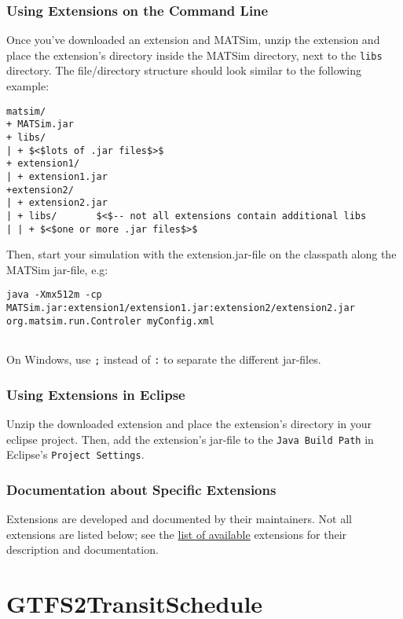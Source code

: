 \documentclass[a4paper,11pt]{report}
\begin{document}
\subsubsection{Using Extensions on the Command Line}

Once you've downloaded an extension and MATSim, unzip the extension  and place the extension's directory inside the MATSim directory, next to  the 
\texttt{libs} directory. The file/directory structure should look similar to the following example:
\begin{verbatim}
matsim/
+ MATSim.jar
+ libs/
| + $<$lots of .jar files$>$
+ extension1/
| + extension1.jar
+extension2/
| + extension2.jar
| + libs/       $<$-- not all extensions contain additional libs
| | + $<$one or more .jar files$>$
\end{verbatim}

Then, start your simulation with the extension.jar-file on the classpath along the MATSim jar-file, e.g:
\begin{verbatim}
java -Xmx512m -cp MATSim.jar:extension1/extension1.jar:extension2/extension2.jar org.matsim.run.Controler myConfig.xml


\end{verbatim}

On Windows, use 
\texttt{;} instead of 
\texttt{:} to separate the different jar-files.

\subsubsection{Using Extensions in Eclipse}

Unzip the downloaded extension and place the extension's directory in  your eclipse project. Then, add the extension's jar-file to the 
\texttt{Java Build Path} in Eclipse's 
\texttt{Project Settings}.

\subsubsection{Documentation about Specific Extensions}

Extensions are developed and documented by their maintainers. Not all extensions are listed below; see the \href{http://www.matsim.org/extensions}{list of available} extensions for their description and documentation.



\vfill\eject
\section{GTFS2TransitSchedule}
\end{document}
